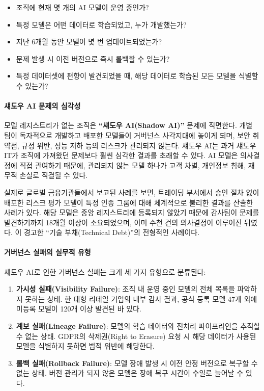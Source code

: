 \begin{itemize}
  \item 조직에 현재 몇 개의 AI 모델이 운영 중인가?
  \item 특정 모델은 어떤 데이터로 학습되었고, 누가 개발했는가?
  \item 지난 6개월 동안 모델이 몇 번 업데이트되었는가?
  \item 문제 발생 시 이전 버전으로 즉시 롤백할 수 있는가?
  \item 특정 데이터셋에 편향이 발견되었을 때, 해당 데이터로 학습된 모든 모델을 식별할 수 있는가?
\end{itemize}

\paragraph{섀도우 AI 문제의 심각성}

모델 레지스트리가 없는 조직은 \textbf{``섀도우 AI(Shadow AI)''} 문제에 직면한다. 개별 팀이 독자적으로 개발하고 배포한 모델들이 거버넌스 사각지대에 놓이게 되며, 보안 취약점, 규정 위반, 성능 저하 등의 리스크가 관리되지 않는다. 섀도우 AI는 과거 섀도우 IT가 조직에 가져왔던 문제보다 훨씬 심각한 결과를 초래할 수 있다. AI 모델은 의사결정에 직접 관여하기 때문에, 관리되지 않는 모델 하나가 고객 차별, 개인정보 침해, 재무적 손실로 직결될 수 있다.

실제로 글로벌 금융기관들에서 보고된 사례를 보면, 트레이딩 부서에서 승인 절차 없이 배포한 리스크 평가 모델이 특정 인종 그룹에 대해 체계적으로 불리한 결과를 산출한 사례가 있다. 해당 모델은 중앙 레지스트리에 등록되지 않았기 때문에 감사팀이 문제를 발견하기까지 18개월 이상이 소요되었으며, 이미 수천 건의 의사결정이 이루어진 뒤였다. \cite{sculley2015hidden}이 경고한 ``기술 부채(Technical Debt)''의 전형적인 사례이다.

\paragraph{거버넌스 실패의 실무적 유형}

섀도우 AI로 인한 거버넌스 실패는 크게 세 가지 유형으로 분류된다:

\begin{enumerate}
  \item \textbf{가시성 실패(Visibility Failure)}: 조직 내 운영 중인 모델의 전체 목록을 파악하지 못하는 상태. 한 대형 리테일 기업의 내부 감사 결과, 공식 등록 모델 47개 외에 미등록 모델이 120개 이상 발견된 바 있다.
  \item \textbf{계보 실패(Lineage Failure)}: 모델의 학습 데이터와 전처리 파이프라인을 추적할 수 없는 상태. GDPR의 삭제권(Right to Erasure) 요청 시 해당 데이터가 사용된 모델을 식별하지 못하면 법적 위반에 해당한다.
  \item \textbf{롤백 실패(Rollback Failure)}: 모델 장애 발생 시 이전 안정 버전으로 복구할 수 없는 상태. 버전 관리가 되지 않은 모델은 장애 복구 시간이 수일로 늘어날 수 있다.
\end{enumerate}

